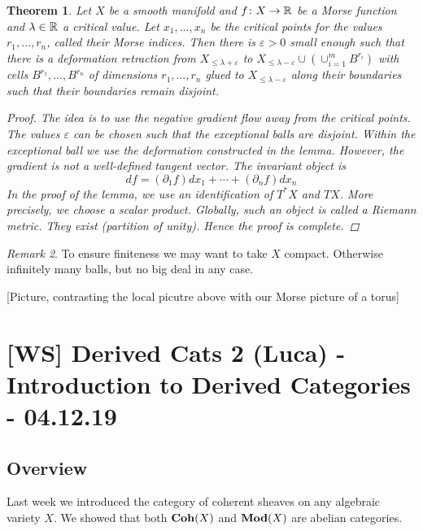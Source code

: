 \documentclass[A4paper, british]{amsart}
\theoremstyle{darkgreentheorem}
\newtheorem{thm}{Theorem}[section]
\theoremstyle{darkbluedefinition}
\theoremstyle{darkredexample}
\theoremstyle{remark}
\newtheorem{rem}[thm]{Remark}
\newcommand{\1}{\mathbbm{1}}
\begin{document}
\begin{thm}
    Let $X$ be a smooth manifold and $f\colon X\to \mathbb{R}$ be a Morse function and $\lambda\in \mathbb{R}$ a critical value.
    Let $x_{1},\ldots,x_{n}$ be the critical points for the values $r_{1},\ldots,r_{n}$, called their Morse indices.
    Then there is $\varepsilon >0$ small enough such that there is a deformation retraction from $X_{\leqslant \lambda+\varepsilon}$ to $X_{\leqslant \lambda-\varepsilon}\cup (\cup_{i=1}^{m}B^{r_{i}})$ with cells $B^{r_{1}},\ldots,B^{r_{n}}$ of dimensions $r_{1},\ldots,r_{n}$ glued to $X_{\leqslant \lambda-\varepsilon }$ along their boundaries such that their boundaries remain disjoint.
    \begin{proof}
	The idea is to use the negative gradient flow away from the critical points.
	The values $\varepsilon$ can be chosen such that the exceptional balls are disjoint.
	Within the exceptional ball we use the deformation constructed in the lemma.
	However, the gradient is not a well-defined tangent vector.
	The invariant object is
	\[ df=(\partial_{1} f)dx_{1}+\cdots +(\partial_{n} f)dx_{n} \]
	In the proof of the lemma, we use an identification of $T^{*}X$ and $TX$.
	More precisely, we choose a scalar product.
	Globally, such an object is called a Riemann metric.
	They exist (partition of unity).
	Hence the proof is complete.
    \end{proof}
\end{thm}

\begin{rem}
    To ensure finiteness we may want to take $X$ compact.
    Otherwise infinitely many balls, but no big deal in any case.
\end{rem}

[Picture, contrasting the local picutre above with our Morse picture of a torus]

\section{[WS] Derived Cats 2 (Luca) - Introduction to Derived Categories - 04.12.19}

\subsection{Overview}

Last week we introduced the category of coherent sheaves on any algebraic variety $X$.
We showed that both $\mathbf{Coh}(X)$ and $\mathbf{Mod}(X)$ are abelian categories.
\end{document}
